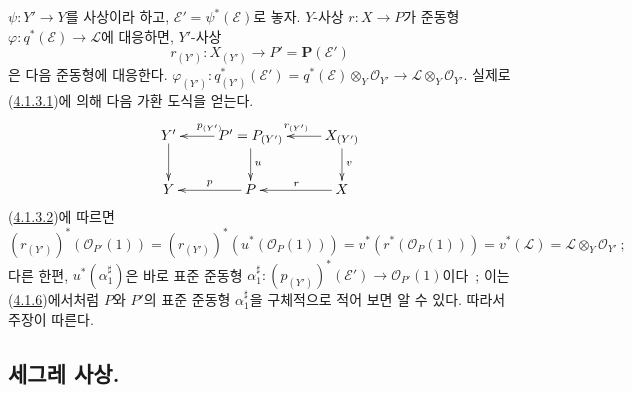 \begin{env}[4.2.10]
\label{II.4.2.10-ko}
$\psi:Y'\to Y$를 사상이라 하고,
$\mathcal{E}'=\psi^*(\mathcal{E})$로 놓자. $Y$-사상 $r:X\to P$가
준동형 $\varphi:q^*(\mathcal{E})\to\mathcal{L}$에 대응하면,
$Y'$-사상
\[
  r_{(Y')}:X_{(Y')}\longrightarrow P'=\mathbf{P}(\mathcal{E}')
\]
은 다음 준동형에 대응한다.
$\varphi_{(Y')}:q_{(Y')}^*(\mathcal{E}')=
  q^*(\mathcal{E})\otimes_Y\mathcal{O}_{Y'}\to
\mathcal{L}\otimes_Y\mathcal{O}_{Y'}$. 실제로
(\hyperref[II.4.1.3.1-ko]{4.1.3.1})에 의해 다음 가환 도식을 얻는다.
\[
  \xymatrix{
    Y' \ar[d]
    & P'=P_{(Y')} \ar[l]_{p_{(Y')}} \ar[d]^{u}
    & X_{(Y')} \ar[l]_{r_{(Y')}} \ar[d]^{v}
    \\Y
    & P \ar[l]_{p}
    & X \ar[l]_{r}
  }
\]
(\hyperref[II.4.1.3.2-ko]{4.1.3.2})에 따르면
\[
  (r_{(Y')})^*(\mathcal{O}_{P'}(1))
  =(r_{(Y')})^*(u^*(\mathcal{O}_P(1)))
  =v^*(r^*(\mathcal{O}_P(1)))
  =v^*(\mathcal{L})=\mathcal{L}\otimes_Y\mathcal{O}_{Y'}~;
\]
다른 한편, $u^*(\alpha_1^\sharp)$은 바로 표준 준동형
$\alpha_1^\sharp:(p_{(Y')})^*(\mathcal{E}')\to\mathcal{O}_{P'}(1)$이다~;
이는 (\hyperref[II.4.1.6-ko]{4.1.6})에서처럼 $P$와 $P'$의 표준
준동형 $\alpha_1^\sharp$을 구체적으로 적어 보면 알 수 있다. 따라서
주장이 따른다.
\end{env}

\subsection{세그레 사상.}
\label{subsection:II.4.3-ko}

